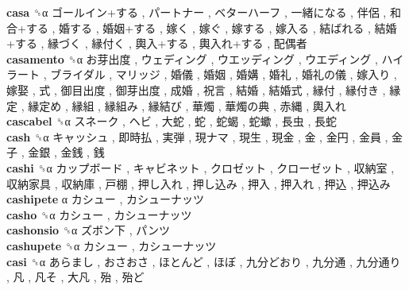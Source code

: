 \textbf{casa} ␝α   ゴールイン+する ,  パートナー ,  ベターハーフ ,  一緒になる ,  伴侶 ,  和合+する ,  婚する ,  婚姻+する ,  嫁く ,  嫁ぐ ,  嫁する ,  嫁入る ,  結ばれる ,  結婚+する ,  縁づく ,  縁付く ,  輿入+する ,  輿入れ+する ,  配偶者   \\
\textbf{casamento} ␝α   お芽出度 ,  ウェディング ,  ウエッディング ,  ウエディング ,  ハイラート ,  ブライダル ,  マリッジ ,  婚儀 ,  婚姻 ,  婚媾 ,  婚礼 ,  婚礼の儀 ,  嫁入り ,  嫁娶 ,  式 ,  御目出度 ,  御芽出度 ,  成婚 ,  祝言 ,  結婚 ,  結婚式 ,  縁付 ,  縁付き ,  縁定 ,  縁定め ,  縁組 ,  縁組み ,  縁結び ,  華燭 ,  華燭の典 ,  赤縄 ,  輿入れ   \\
\textbf{cascabel} ␝α   スネーク ,  ヘビ ,  大蛇 ,  蛇 ,  蛇蝎 ,  蛇蠍 ,  長虫 ,  長蛇   \\
\textbf{cash} ␝α   キャッシュ ,  即時払 ,  実弾 ,  現ナマ ,  現生 ,  現金 ,  金 ,  金円 ,  金員 ,  金子 ,  金銀 ,  金銭 ,  銭   \\
\textbf{cashi} ␝α   カップボード ,  キャビネット ,  クロゼット ,  クローゼット ,  収納室 ,  収納家具 ,  収納庫 ,  戸棚 ,  押し入れ ,  押し込み ,  押入 ,  押入れ ,  押込 ,  押込み   \\
\textbf{cashipete} α   カシュー ,  カシューナッツ   \\
\textbf{casho} ␝α   カシュー ,  カシューナッツ   \\
\textbf{cashonsio} ␝α   ズボン下 ,  パンツ   \\
\textbf{cashupete} ␝α   カシュー ,  カシューナッツ   \\
\textbf{casi} ␝α   あらまし ,  おさおさ ,  ほとんど ,  ほぼ ,  九分どおり ,  九分通 ,  九分通り ,  凡 ,  凡そ ,  大凡 ,  殆 ,  殆ど   \\
